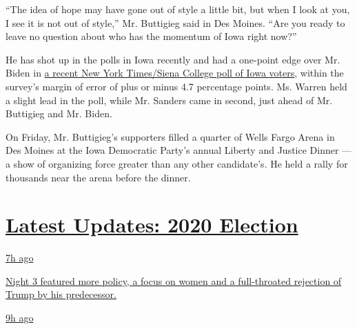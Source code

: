 ``The idea of hope may have gone out of style a little bit, but when I
look at you, I see it is not out of style,'' Mr. Buttigieg said in Des
Moines. ``Are you ready to leave no question about who has the momentum
of Iowa right now?''

He has shot up in the polls in Iowa recently and had a one-point edge
over Mr. Biden in
\href{https://www.nytimes3xbfgragh.onion/2019/11/01/us/politics/iowa-poll-warren-biden.html}{a
recent New York Times/Siena College poll of Iowa voters}, within the
survey's margin of error of plus or minus 4.7 percentage points. Ms.
Warren held a slight lead in the poll, while Mr. Sanders came in second,
just ahead of Mr. Buttigieg and Mr. Biden.

On Friday, Mr. Buttigieg's supporters filled a quarter of Wells Fargo
Arena in Des Moines at the Iowa Democratic Party's annual Liberty and
Justice Dinner --- a show of organizing force greater than any other
candidate's. He held a rally for thousands near the arena before the
dinner.

\hypertarget{latest-updates-2020-election}{%
\section{\texorpdfstring{\href{https://www.nytimes3xbfgragh.onion/live/2020/08/19/us/dnc-convention-election?action=click\&pgtype=Article\&state=default\&region=MAIN_CONTENT_1\&context=storylines_live_updates}{Latest
Updates: 2020
Election}}{Latest Updates: 2020 Election}}\label{latest-updates-2020-election}}

\href{https://www.nytimes3xbfgragh.onion/live/2020/08/19/us/dnc-convention-election?action=click\&pgtype=Article\&state=default\&region=MAIN_CONTENT_1\&context=storylines_live_updates\#night-3-featured-more-policy-a-focus-on-women-and-a-full-throated-rejection-of-trump-by-his-predecessor}{7h
ago}

\href{https://www.nytimes3xbfgragh.onion/live/2020/08/19/us/dnc-convention-election?action=click\&pgtype=Article\&state=default\&region=MAIN_CONTENT_1\&context=storylines_live_updates\#night-3-featured-more-policy-a-focus-on-women-and-a-full-throated-rejection-of-trump-by-his-predecessor}{Night
3 featured more policy, a focus on women and a full-throated rejection
of Trump by his predecessor.}

\href{https://www.nytimes3xbfgragh.onion/live/2020/08/19/us/dnc-convention-election?action=click\&pgtype=Article\&state=default\&region=MAIN_CONTENT_1\&context=storylines_live_updates\#trump-live-tweeted-obamas-speech-tonight-hell-appear-on-fox-news-right-before-bidens-tomorrow}{9h
ago}

